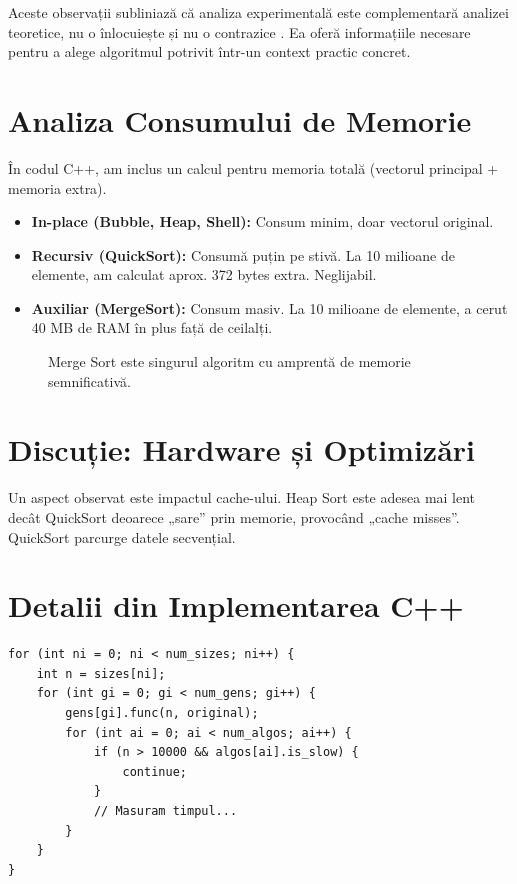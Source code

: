 \documentclass[12pt, a4paper]{article}
\begin{document}
Aceste observații subliniază că analiza experimentală este complementară
analizei teoretice, nu o înlocuiește și nu o contrazice
\citep{bentley2000}. Ea oferă informațiile necesare pentru a alege
algoritmul potrivit într-un context practic concret.

\section{Analiza Consumului de Memorie}
În codul C++, am inclus un calcul pentru memoria totală (vectorul principal + memoria extra).

\begin{itemize}
    \item \textbf{In-place (Bubble, Heap, Shell):} Consum minim, doar vectorul original.
    \item \textbf{Recursiv (QuickSort):} Consumă puțin pe stivă. La 10 milioane de elemente, am calculat aprox. 372 bytes extra. Neglijabil.
    \item \textbf{Auxiliar (MergeSort):} Consum masiv. La 10 milioane de elemente, a cerut 40 MB de RAM în plus față de ceilalți.
\end{itemize}

\begin{figure}[H]
\centering
{}
\caption{Merge Sort este singurul algoritm cu amprentă de memorie semnificativă.}
\end{figure}

\section{Discuție: Hardware și Optimizări}
Un aspect observat este impactul cache-ului. Heap Sort este adesea mai lent decât QuickSort deoarece „sare” prin memorie, provocând „cache misses”. QuickSort parcurge datele secvențial.

\section{Detalii din Implementarea C++}
\begin{lstlisting}
for (int ni = 0; ni < num_sizes; ni++) {
    int n = sizes[ni];
    for (int gi = 0; gi < num_gens; gi++) {
        gens[gi].func(n, original); 
        for (int ai = 0; ai < num_algos; ai++) {
            if (n > 10000 && algos[ai].is_slow) {
                continue;
            }
            // Masuram timpul...
        }
    }
}
\end{lstlisting}
\end{document}
